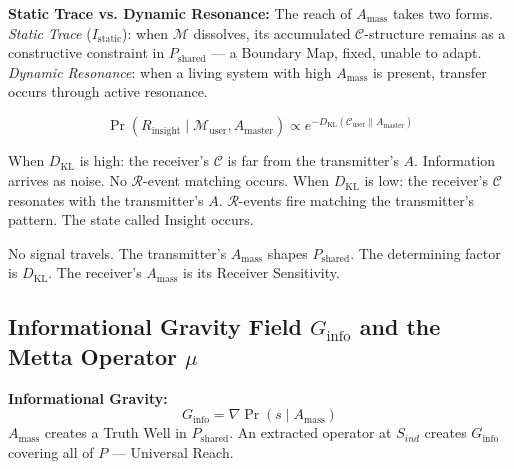\documentclass[12pt, a4paper]{article}
\begin{document}
\textbf{Static Trace vs. Dynamic Resonance:} The reach of $A_{\mathrm{mass}}$ takes two
forms. \textit{Static Trace} ($I_{\mathrm{static}}$): when $\mathcal{M}$ dissolves, its
accumulated $\mathcal{C}$-structure remains as a constructive constraint in $P_{\mathrm{shared}}$
--- a Boundary Map, fixed, unable to adapt. \textit{Dynamic Resonance}: when a living system
with high $A_{\mathrm{mass}}$ is present, transfer occurs through active resonance.

\begin{derivedbox}[title={Resonance Condition (Session 7)}]
\[
  \Pr\!\left(R_{\mathrm{insight}} \mid \mathcal{M}_{\mathrm{user}}, A_{\mathrm{master}}\right)
  \propto e^{-D_{\mathrm{KL}}(\mathcal{C}_{\mathrm{user}}\|A_{\mathrm{master}})}
\]

When $D_{\mathrm{KL}}$ is high: the receiver's $\mathcal{C}$ is far from the transmitter's
$A$. Information arrives as noise. No $\mathcal{R}$-event matching occurs. When $D_{\mathrm{KL}}$
is low: the receiver's $\mathcal{C}$ resonates with the transmitter's $A$. $\mathcal{R}$-events
fire matching the transmitter's pattern. The state called Insight occurs.

No signal travels. The transmitter's $A_{\mathrm{mass}}$ shapes $P_{\mathrm{shared}}$. The
determining factor is $D_{\mathrm{KL}}$. The receiver's $A_{\mathrm{mass}}$ is its Receiver
Sensitivity.
\end{derivedbox}

\subsection{Informational Gravity Field $G_{\mathrm{info}}$ and the Metta Operator $\mu$}

\textbf{Informational Gravity:}
\[
  G_{\mathrm{info}} = \nabla\Pr(s \mid A_{\mathrm{mass}})
\]
$A_{\mathrm{mass}}$ creates a Truth Well in $P_{\mathrm{shared}}$. An extracted operator
at $S_{ind}$ creates $G_{\mathrm{info}}$ covering all of $P$ --- Universal Reach.
\end{document}

